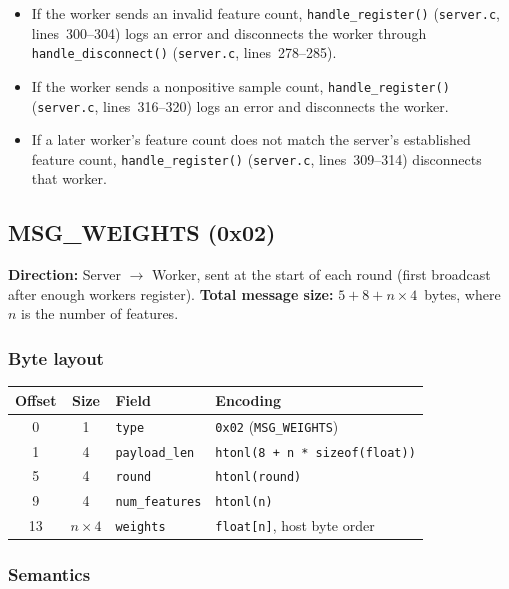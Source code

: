 \documentclass[11pt]{article}
\begin{document}
\begin{itemize}
  \item If the worker sends an invalid feature count, \texttt{handle\_register()} (\texttt{server.c}, lines~300--304) logs an error and disconnects the worker through \texttt{handle\_disconnect()} (\texttt{server.c}, lines~278--285).
  \item If the worker sends a nonpositive sample count, \texttt{handle\_register()} (\texttt{server.c}, lines~316--320) logs an error and disconnects the worker.
  \item If a later worker's feature count does not match the server's established feature count, \texttt{handle\_register()} (\texttt{server.c}, lines~309--314) disconnects that worker.
\end{itemize}

\subsection{MSG\_WEIGHTS (0x02)}

\textbf{Direction:} Server $\to$ Worker, sent at the start of each round (first broadcast after enough workers register).
\textbf{Total message size:} $5 + 8 + n \times 4$~bytes, where $n$ is the number of features.

\subsubsection*{Byte layout}

\begin{table}[H]
\centering
\begin{tabular}{@{}c c l l@{}}
\toprule
\textbf{Offset} & \textbf{Size} & \textbf{Field} & \textbf{Encoding} \\
\midrule
0  & 1            & \texttt{type}          & \texttt{0x02} (\texttt{MSG\_WEIGHTS}) \\
1  & 4            & \texttt{payload\_len}  & \texttt{htonl(8 + n * sizeof(float))} \\
5  & 4            & \texttt{round}         & \texttt{htonl(round)} \\
9  & 4            & \texttt{num\_features} & \texttt{htonl(n)} \\
13 & $n \times 4$ & \texttt{weights}       & \texttt{float[n]}, host byte order \\
\bottomrule
\end{tabular}
\end{table}

\subsubsection*{Semantics}
\end{document}

